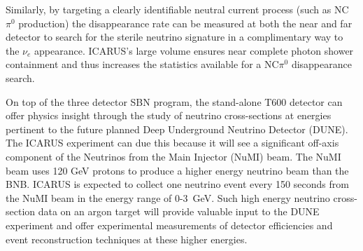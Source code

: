 Similarly, by targeting a clearly identifiable neutral current process (such as NC$\pi^{0}$ production) the disappearance rate can be measured at both the near and far detector to search for the sterile neutrino signature in a complimentary way to the $\nu_{e}$ appearance. ICARUS's large volume ensures near complete photon shower containment and thus increases the statistics available for a NC$\pi^{0}$ disappearance search.

On top of the three detector SBN program, the stand-alone T600 detector can offer physics insight through the study of neutrino cross-sections at energies pertinent to the future planned Deep Underground Neutrino Detector (DUNE). The ICARUS experiment can due this because it will see a significant off-axis component of the Neutrinos from the Main Injector (NuMI) beam. The NuMI beam uses 120 GeV protons to produce a higher energy neutrino beam than the BNB. ICARUS is expected to collect one neutrino event every 150 seconds from the NuMI beam in the energy range of 0-3~GeV. Such high energy neutrino cross-section data on an argon target will provide valuable input to the DUNE experiment and offer experimental measurements of detector efficiencies and event reconstruction techniques at these higher energies.

